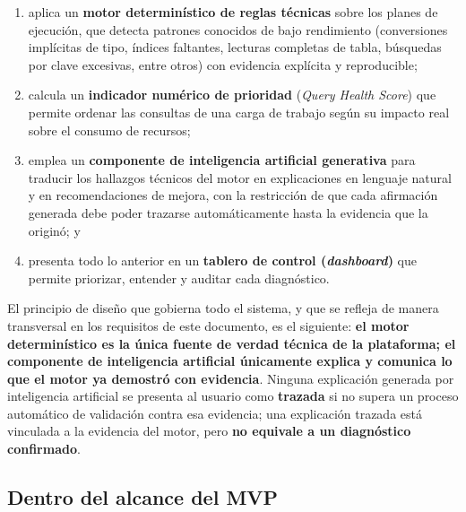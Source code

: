 \documentclass[11pt,a4paper]{report}
\begin{document}
\begin{enumerate}
\item aplica un \textbf{motor determin\'istico de reglas t\'ecnicas} sobre los planes de ejecuci\'on, que detecta patrones conocidos de bajo rendimiento (conversiones impl\'icitas de tipo, \'indices faltantes, lecturas completas de tabla, b\'usquedas por clave excesivas, entre otros) con evidencia expl\'icita y reproducible;
\item calcula un \textbf{indicador num\'erico de prioridad} (\textit{Query Health Score}) que permite ordenar las consultas de una carga de trabajo seg\'un su impacto real sobre el consumo de recursos;
\item emplea un \textbf{componente de inteligencia artificial generativa} para traducir los hallazgos t\'ecnicos del motor en explicaciones en lenguaje natural y en recomendaciones de mejora, con la restricci\'on de que cada afirmaci\'on generada debe poder trazarse autom\'aticamente hasta la evidencia que la origin\'o; y
\item presenta todo lo anterior en un \textbf{tablero de control (\textit{dashboard})} que permite priorizar, entender y auditar cada diagn\'ostico.
\end{enumerate}

El principio de dise\~no que gobierna todo el sistema, y que se refleja de manera transversal en los requisitos de este documento, es el siguiente: \textbf{el motor determin\'istico es la \'unica fuente de verdad t\'ecnica de la plataforma; el componente de inteligencia artificial \'unicamente explica y comunica lo que el motor ya demostr\'o con evidencia}. Ninguna explicaci\'on generada por inteligencia artificial se presenta al usuario como \textbf{trazada} si no supera un proceso autom\'atico de validaci\'on contra esa evidencia; una explicaci\'on trazada est\'a vinculada a la evidencia del motor, pero \textbf{no equivale a un diagn\'ostico confirmado}.

\subsection{Dentro del alcance del MVP}
\end{document}
